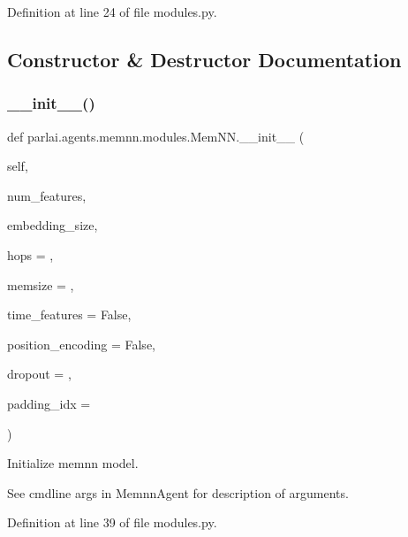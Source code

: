 Definition at line 24 of file modules.\+py.



\subsection{Constructor \& Destructor Documentation}
\mbox{\label{classparlai_1_1agents_1_1memnn_1_1modules_1_1MemNN_a8bfe18ec94ebe8fc68a4147a1ebcbcb4}} 
\subsubsection{\texorpdfstring{\+\_\+\+\_\+init\+\_\+\+\_\+()}{\_\_init\_\_()}}
{\footnotesize\ttfamily def parlai.\+agents.\+memnn.\+modules.\+Mem\+N\+N.\+\_\+\+\_\+init\+\_\+\+\_\+ (\begin{DoxyParamCaption}\item[{}]{self,  }\item[{}]{num\+\_\+features,  }\item[{}]{embedding\+\_\+size,  }\item[{}]{hops = {},  }\item[{}]{memsize = {},  }\item[{}]{time\+\_\+features = {\ttfamily False},  }\item[{}]{position\+\_\+encoding = {\ttfamily False},  }\item[{}]{dropout = {},  }\item[{}]{padding\+\_\+idx = {} }\end{DoxyParamCaption})}

\begin{DoxyVerb}Initialize memnn model.

See cmdline args in MemnnAgent for description of arguments.
\end{DoxyVerb}
 

Definition at line 39 of file modules.\+py.


